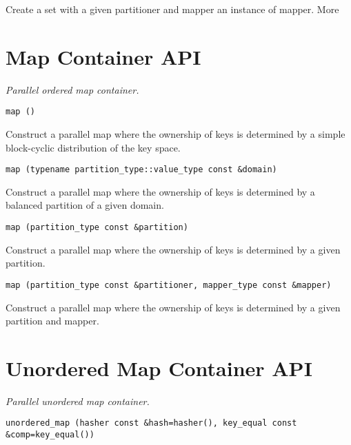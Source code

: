 Create a set with a given partitioner and mapper an instance of mapper. More


\section{ Map Container API } \label{sec-map-cont}

\emph {Parallel ordered map container.}

\begin{verbatim}
map ()
\end{verbatim}

Construct a parallel map where the ownership of keys is determined by a simple block-cyclic distribution of the key space. 
 
\begin{verbatim}
map (typename partition_type::value_type const &domain)
\end{verbatim}

Construct a parallel map where the ownership of keys is determined by a balanced partition of a given domain. 
 
\begin{verbatim}
map (partition_type const &partition)
\end{verbatim}

Construct a parallel map where the ownership of keys is determined by a given partition. 
 
\begin{verbatim}
map (partition_type const &partitioner, mapper_type const &mapper)
\end{verbatim}

Construct a parallel map where the ownership of keys is determined by a given partition and mapper. 


\section{ Unordered Map Container API } \label{sec-unmap-cont}

\emph {Parallel unordered map container.}

\begin{verbatim}
unordered_map (hasher const &hash=hasher(), key_equal const &comp=key_equal())
\end{verbatim}

